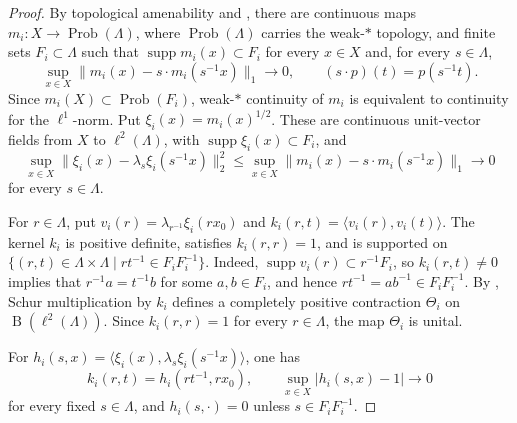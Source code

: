 \documentclass[11pt]{amsart}
\numberwithin{equation}{section}
\newcommand{\Prob}{\operatorname{Prob}}
\newcommand{\rB}{\operatorname{B}}
\newcommand{\supp}{\operatorname{supp}}
\theoremstyle{definition}
\begin{document}
	\begin{proof}
		By topological amenability and \cite[Lemma~4.3.8]{BO08}, there are continuous maps \(m_i:X\longrightarrow\Prob(\Lambda)\), where \(\Prob(\Lambda)\) carries the weak-$\ast$ topology, and finite sets \(F_i\subset\Lambda\) such that \(\supp m_i(x)\subset F_i\) for every \(x\in X\) and, for every \(s\in\Lambda\),
		\[
		\sup_{x\in X}
		\|m_i(x)-s\mathbin{\cdot}m_i(s^{-1}x)\|_1
		\longrightarrow0,
		\qquad
		(s\mathbin{\cdot}p)(t)=p(s^{-1}t).
		\]
		Since \(m_i(X)\subset\Prob(F_i)\), weak-$\ast$ continuity of \(m_i\) is equivalent to continuity for the \(\ell^1\)-norm. Put \(\xi_i(x)=m_i(x)^{1/2}\). These are continuous unit-vector fields from \(X\) to \(\ell^2(\Lambda)\), with \(\supp\xi_i(x)\subset F_i\), and
		\[
		\sup_{x\in X}
		\|\xi_i(x)-\lambda_s\xi_i(s^{-1}x)\|_2^2
		\leq
		\sup_{x\in X}
		\|m_i(x)-s\mathbin{\cdot}m_i(s^{-1}x)\|_1
		\longrightarrow0
		\]
		for every \(s\in\Lambda\).
		
		For \(r\in\Lambda\), put \(v_i(r)=\lambda_{r^{-1}}\xi_i(rx_0)\) and \(k_i(r,t)=\langle v_i(r),v_i(t)\rangle\). The kernel \(k_i\) is positive definite, satisfies \(k_i(r,r)=1\), and is supported on \(\{(r,t)\in\Lambda\times\Lambda\mid rt^{-1}\in F_iF_i^{-1}\}\).
		Indeed, \(\operatorname{supp}v_i(r)\subset r^{-1}F_i\), so \(k_i(r,t)\neq0\) implies that \(r^{-1}a=t^{-1}b\) for some \(a,b\in F_i\), and hence \(rt^{-1}=ab^{-1}\in F_iF_i^{-1}\).
		By \cite[Theorem~D.3]{BO08}, Schur multiplication by \(k_i\) defines a completely positive contraction \(\Theta_i\) on \(\rB(\ell^2(\Lambda))\). Since \(k_i(r,r)=1\) for every \(r\in\Lambda\), the map \(\Theta_i\) is unital.
		
		For \(h_i(s,x)=\langle\xi_i(x),\lambda_s\xi_i(s^{-1}x)\rangle\), one has
		\begin{equation}\label{eq:itap-schur-coefficient}
			k_i(r,t)=h_i(rt^{-1},rx_0),
			\qquad
			\sup_{x\in X}|h_i(s,x)-1|\longrightarrow0
		\end{equation}
		for every fixed \(s\in\Lambda\), and \(h_i(s,\mathord\cdot)=0\) unless \(s\in F_iF_i^{-1}\).
		

\end{proof}
\end{document}
